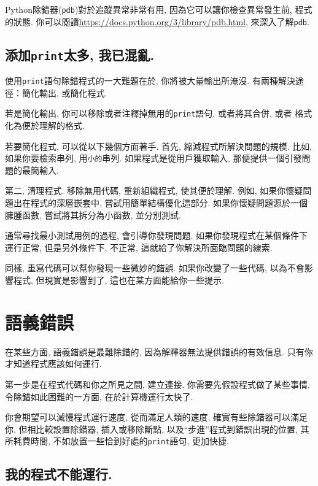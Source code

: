 \documentclass[10pt]{book}
\begin{document}
Python除錯器({\tt pdb})對於追蹤異常非常有用, 
因為它可以讓你檢查異常發生前, 程式的狀態. 
你可以閱讀\url{https://docs.python.org/3/library/pdb.html}, 來深入了解{\tt pdb}.


\subsection{添加{\tt print}太多, 我已混亂.}

使用{\tt print}語句除錯程式的一大難題在於, 你將被大量輸出所淹沒. 
有兩種解決途徑：簡化輸出, 或簡化程式. 

若是簡化輸出, 你可以移除或者注釋掉無用的{\tt print}語句, 或者將其合併, 或者
格式化為便於理解的格式. 

若要簡化程式, 可以從以下幾個方面著手. 
首先, 縮減程式所解決問題的規模. 
比如, 如果你要檢索串列, 用{\tt 小的}串列. 
如果程式是從用戶獲取輸入, 那便提供一個引發問題的最簡輸入. 

第二, 清理程式. 移除無用代碼, 重新組織程式, 使其便於理解. 
例如, 如果你懷疑問題出在程式的深層嵌套中, 
嘗試用簡單結構優化這部分. 
如果你懷疑問題源於一個臃腫函數, 嘗試將其拆分為小函數, 並分別測試. 

通常尋找最小測試用例的過程, 會引導你發現問題. 
如果你發現程式在某個條件下運行正常, 但是另外條件下, 不正常, 
這就給了你解決所面臨問題的線索. 

同樣, 重寫代碼可以幫你發現一些微妙的錯誤. 
如果你改變了一些代碼, 以為不會影響程式, 但現實是影響到了, 
這也在某方面能給你一些提示. 


\section{語義錯誤}

在某些方面, 語義錯誤是最難除錯的, 
因為解釋器無法提供錯誤的有效信息. 
只有你才知道程式應該如何運行. 

第一步是在程式代碼和你之所見之間, 建立連接. 
你需要先假設程式做了某些事情. 
令除錯如此困難的一方面, 在於計算機運行太快了. 

你會期望可以減慢程式運行速度, 從而滿足人類的速度, 
確實有些除錯器可以滿足你. 
但相比較設置除錯器, 插入或移除斷點, 以及``步進''程式到錯誤出現的位置, 其所耗費時間, 
不如放置一些恰到好處的{\tt print}語句, 更加快捷. 

\subsection{我的程式不能運行.}
\end{document}
